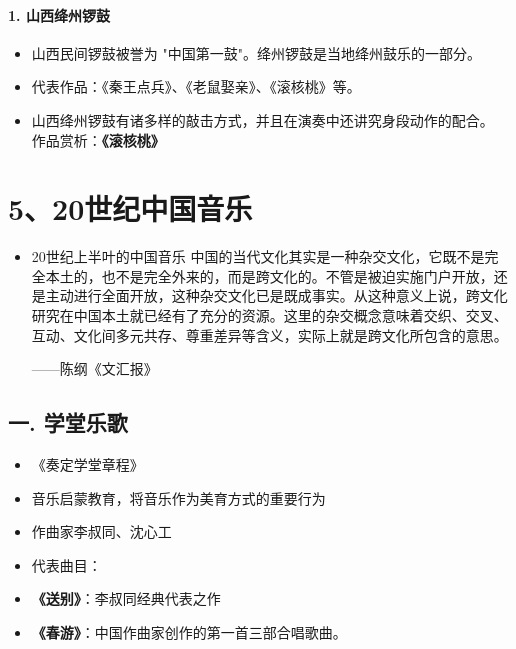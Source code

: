 \documentclass[
]{article}
\providecommand{\tightlist}{%
  \setlength{\itemsep}{0pt}\setlength{\parskip}{0pt}}
\begin{document}
\paragraph{1. 山西绛州锣鼓}\label{ux5c71ux897fux7edbux5ddeux9523ux9f13}

\begin{itemize}
\tightlist
\item
  山西民间锣鼓被誉为 "中国第一鼓"。绛州锣鼓是当地绛州鼓乐的一部分。
\item
  代表作品：《秦王点兵》、《老鼠娶亲》、《滚核桃》等。
\item
  山西绛州锣鼓有诸多样的敲击方式，并且在演奏中还讲究身段动作的配合。\\
  作品赏析：\textbf{《滚核桃》}
\end{itemize}

\section{5、20世纪中国音乐}\label{ux4e16ux7eaaux4e2dux56fdux97f3ux4e50}


\begin{itemize}
\item
  20世纪上半叶的中国音乐
  中国的当代文化其实是一种杂交文化，它既不是完全本土的，也不是完全外来的，而是跨文化的。不管是被迫实施门户开放，还是主动进行全面开放，这种杂交文化已是既成事实。从这种意义上说，跨文化研究在中国本土就已经有了充分的资源。这里的杂交概念意味着交织、交叉、互动、文化间多元共存、尊重差异等含义，实际上就是跨文化所包含的意思。

  ------陈纲《文汇报》

\end{itemize}

\subsection{一. 学堂乐歌}\label{ux4e00.-ux5b66ux5802ux4e50ux6b4c}

\begin{itemize}
\item
  《奏定学堂章程》
\item
  音乐启蒙教育，将音乐作为美育方式的重要行为
\item
  作曲家李叔同、沈心工
\item
  代表曲目：
\item
  \textbf{《送别》}：李叔同经典代表之作
\item
  \textbf{《春游》}：中国作曲家创作的第一首三部合唱歌曲。
\end{itemize}
\end{document}
